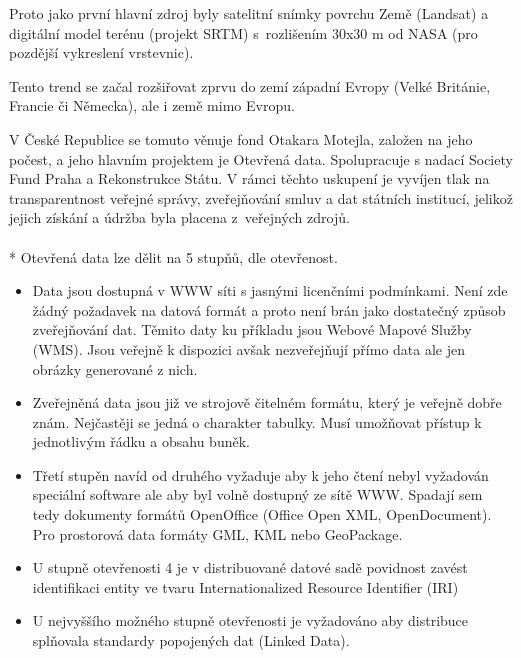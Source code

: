 Proto jako první hlavní zdroj byly satelitní snímky povrchu Země (Landsat) %
a digitální model terénu (projekt SRTM) %
s~rozlišením 30x30 m od NASA (pro pozdější vykreslení vrstevnic).

Tento trend se začal rozšiřovat zprvu do zemí západní Evropy
(Velké Británie, Francie či Německa), ale i země mimo Evropu.\cite{OpendataTrends}

V České Republice se tomuto věnuje fond Otakara Motejla, založen na jeho počest,
a jeho hlavním projektem je Otevřená data. Spolupracuje s nadací Society Fund
Praha a Rekonstrukce Státu.
V rámci těchto uskupení je vyvíjen tlak na transparentnost veřejné správy,
zveřejňování smluv a dat státních institucí, jelikož jejich získání a údržba byla
placena z~veřejných zdrojů.
\\
\\*
Otevřená data lze dělit na 5 stupňů,
dle otevřenost.

\begin{itemize}

    \item   Data jsou dostupná v WWW síti s jasnými licenčními podmínkami.
            Není zde žádný požadavek na datová formát a proto není brán jako
            dostatečný způsob zveřejňování dat. Těmito daty ku příkladu jsou
            Webové Mapové Služby (WMS). Jsou veřejně k dispozici avšak
            nezveřejňují přímo data ale jen obrázky generované z nich.

    \item   Zveřejněná data jsou již ve strojově čitelném formátu, který je
            veřejně dobře znám. Nejčastěji se jedná o charakter tabulky.
            Musí umožňovat přístup k jednotlivým řádku a obsahu buněk.

    \item   Třetí stupěn navíd od druhého vyžaduje aby k jeho čtení nebyl
            vyžadován speciální software ale aby byl volně dostupný ze sítě WWW.
            Spadají sem tedy dokumenty formátů OpenOffice (Office Open XML,
            OpenDocument). Pro prostorová data formáty GML, KML nebo GeoPackage.

    \item   U stupně otevřenosti 4 je v distribuované datové sadě
            povidnost zavést identifikaci entity ve tvaru Internationalized
            Resource Identifier (IRI)

    \item   U nejvyššího možného stupně otevřenosti je vyžadováno aby distribuce
            splňovala standardy popojených dat (Linked Data).

\end{itemize}

